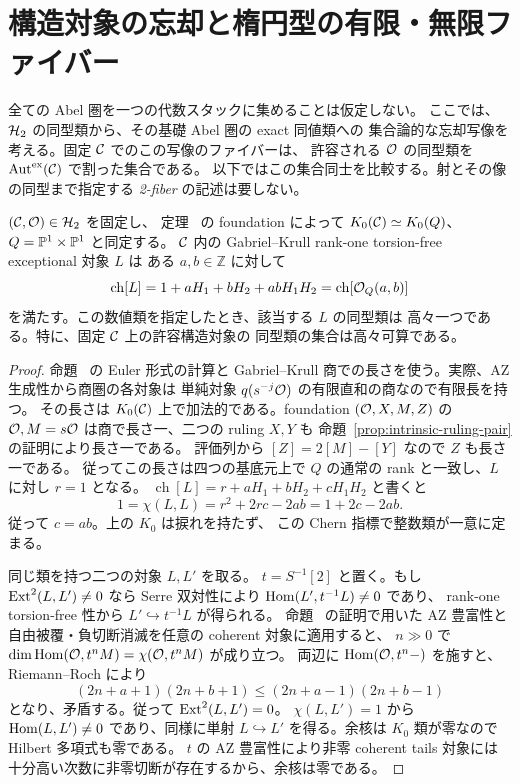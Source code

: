 \section{構造対象の忘却と楕円型の有限・無限ファイバー}
\label{sec:unpointed-elliptic-fiber}

全ての Abel 圏を一つの代数スタックに集めることは仮定しない。
ここでは、$\mathcal H_2$ の同型類から、その基礎 Abel 圏の exact 同値類への
集合論的な忘却写像を考える。固定 $\mathcal C$ でのこの写像のファイバーは、
許容される $\mathcal O$ の同型類を
$\operatorname{Aut}^{\mathrm{ex}}(\mathcal C)$ で割った集合である。
以下ではこの集合同士を比較する。射とその像の同型まで指定する \emph{2-fiber} の記述は要しない。

\begin{lemma}[許容構造対象の数値類と一意性]
\label{lem:forgetting-numerical-rigidity}
$(\mathcal C,\mathcal O)\in\mathcal H_2$ を固定し、
定理~\cite[\texttt{thm:normal-helix}]{QuadricIntrinsic2026} の foundation によって
$K_0(\mathcal C)\simeq K_0(Q)$、$Q=\mathbb P^1\times\mathbb P^1$ と同定する。
$\mathcal C$ 内の Gabriel--Krull rank-one torsion-free exceptional 対象 $L$ は
ある $a,b\in\mathbb Z$ に対して
\[
 \operatorname{ch}[L]
 =1+aH_1+bH_2+abH_1H_2
 =\operatorname{ch}[\mathcal O_Q(a,b)]
\]
を満たす。この数値類を指定したとき、該当する $L$ の同型類は
高々一つである。特に、固定 $\mathcal C$ 上の許容構造対象の
同型類の集合は高々可算である。
\end{lemma}
\begin{proof}
命題~\cite[\texttt{prop:first-orbit-object}]{QuadricIntrinsic2026} の Euler 形式の計算と
Gabriel--Krull 商での長さを使う。実際、AZ 生成性から商圏の各対象は
単純対象 $q(s^{-j}\mathcal O)$ の有限直和の商なので有限長を持つ。
その長さは $K_0(\mathcal C)$ 上で加法的である。foundation $(\mathcal O,X,M,Z)$ の
$\mathcal O,M=s\mathcal O$ は商で長さ一、二つの ruling $X,Y$ も
命題~\ref{prop:intrinsic-ruling-pair} の証明により長さ一である。
評価列から $[Z]=2[M]-[Y]$ なので $Z$ も長さ一である。
従ってこの長さは四つの基底元上で $Q$ の通常の rank と一致し、$L$ に対し $r=1$ となる。
$\operatorname{ch}[L]=r+aH_1+bH_2+cH_1H_2$ と書くと
\[
 1=\chi(L,L)=r^2+2rc-2ab=1+2c-2ab.
\]
従って $c=ab$。上の $K_0$ は捩れを持たず、
この Chern 指標で整数類が一意に定まる。

同じ類を持つ二つの対象 $L,L'$ を取る。
$t=S^{-1}[2]$ と置く。もし $\operatorname{Ext}^2(L,L')\ne0$ なら
Serre 双対性により $\operatorname{Hom}(L',t^{-1}L)\ne0$ であり、
rank-one torsion-free 性から $L'\hookrightarrow t^{-1}L$ が得られる。
命題~\cite[\texttt{prop:first-orbit-object}]{QuadricIntrinsic2026} の証明で用いた AZ 豊富性と
自由被覆・負切断消滅を任意の coherent 対象に適用すると、
$n\gg0$ で
$\dim\operatorname{Hom}(\mathcal O,t^n M)=\chi(\mathcal O,t^nM)$ が成り立つ。
両辺に $\operatorname{Hom}(\mathcal O,t^n-)$ を施すと、Riemann--Roch により
\[
 (2n+a+1)(2n+b+1)
 \le(2n+a-1)(2n+b-1)
\]
となり、矛盾する。従って $\operatorname{Ext}^2(L,L')=0$。
$\chi(L,L')=1$ から $\operatorname{Hom}(L,L')\ne0$ であり、同様に単射
$L\hookrightarrow L'$ を得る。余核は $K_0$ 類が零なので
Hilbert 多項式も零である。
$t$ の AZ 豊富性により非零 coherent tails 対象には
十分高い次数に非零切断が存在するから、余核は零である。
\end{proof}

